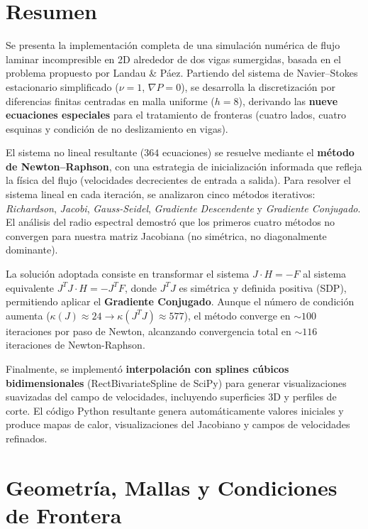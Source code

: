 \documentclass[11pt,letterpaper]{article}
\begin{document}
\tableofcontents
\newpage

\section*{Resumen}
Se presenta la implementación completa de una simulación numérica de flujo laminar incompresible en 2D alrededor de dos vigas sumergidas, basada en el problema propuesto por Landau \& Páez. Partiendo del sistema de Navier--Stokes estacionario simplificado ($\nu=1$, $\nabla P=0$), se desarrolla la discretización por diferencias finitas centradas en malla uniforme ($h=8$), derivando las \textbf{nueve ecuaciones especiales} para el tratamiento de fronteras (cuatro lados, cuatro esquinas y condición de no deslizamiento en vigas).

El sistema no lineal resultante ($364$ ecuaciones) se resuelve mediante el \textbf{método de Newton--Raphson}, con una estrategia de inicialización informada que refleja la física del flujo (velocidades decrecientes de entrada a salida). Para resolver el sistema lineal en cada iteración, se analizaron cinco métodos iterativos: \emph{Richardson}, \emph{Jacobi}, \emph{Gauss-Seidel}, \emph{Gradiente Descendente} y \emph{Gradiente Conjugado}. El análisis del radio espectral demostró que los primeros cuatro métodos no convergen para nuestra matriz Jacobiana (no simétrica, no diagonalmente dominante).

La solución adoptada consiste en transformar el sistema $J\cdot H = -F$ al sistema equivalente $J^T J \cdot H = -J^T F$, donde $J^T J$ es simétrica y definida positiva (SDP), permitiendo aplicar el \textbf{Gradiente Conjugado}. Aunque el número de condición aumenta ($\kappa(J)\approx24 \to \kappa(J^TJ)\approx577$), el método converge en $\sim100$ iteraciones por paso de Newton, alcanzando convergencia total en $\sim116$ iteraciones de Newton-Raphson.

Finalmente, se implementó \textbf{interpolación con splines cúbicos bidimensionales} (RectBivariateSpline de SciPy) para generar visualizaciones suavizadas del campo de velocidades, incluyendo superficies 3D y perfiles de corte. El código Python resultante genera automáticamente valores iniciales y produce mapas de calor, visualizaciones del Jacobiano y campos de velocidades refinados.
\newpage

\section{Geometría, Mallas y Condiciones de Frontera}
\end{document}
